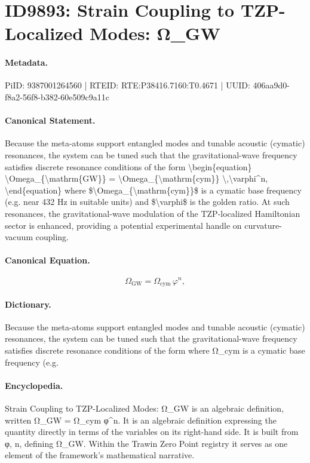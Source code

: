 \section*{ID9893: Strain Coupling to TZP-Localized Modes: Ω\_GW}
\paragraph{Metadata.}
PiID: 9387001264560 | RTEID: RTE:P38416.7160:T0.4671 | UUID: 406aa9d0-f8a2-56f8-b382-60e509c9a11c

\paragraph{Canonical Statement.}
Because the meta-atoms support entangled modes and tunable acoustic (cymatic) resonances, the system can be tuned such that the gravitational-wave frequency satisfies discrete resonance conditions of the form \textbackslash{}begin\{equation\} \textbackslash{}Omega\_\{\textbackslash{}mathrm\{GW\}\} = \textbackslash{}Omega\_\{\textbackslash{}mathrm\{cym\}\} \textbackslash{},\textbackslash{}varphi\textasciicircum{}n, \textbackslash{}end\{equation\} where \$\textbackslash{}Omega\_\{\textbackslash{}mathrm\{cym\}\}\$ is a cymatic base frequency (e.g. near 432 Hz in suitable units) and \$\textbackslash{}varphi\$ is the golden ratio. At such resonances, the gravitational-wave modulation of the TZP-localized Hamiltonian sector is enhanced, providing a potential experimental handle on curvature-vacuum coupling.

\paragraph{Canonical Equation.}
\[
\Omega_{\mathrm{GW}} = \Omega_{\mathrm{cym}} \,\varphi^n,
\]

\paragraph{Dictionary.}
Because the meta-atoms support entangled modes and tunable acoustic (cymatic) resonances, the system can be tuned such that the gravitational-wave frequency satisfies discrete resonance conditions of the form where Ω\_cym is a cymatic base frequency (e.g.

\paragraph{Encyclopedia.}
Strain Coupling to TZP-Localized Modes: Ω\_GW is an algebraic definition, written Ω\_GW = Ω\_cym φ\textasciicircum{}n. It is an algebraic definition expressing the quantity directly in terms of the variables on its right-hand side. It is built from φ, n, defining Ω\_GW. Within the Trawin Zero Point registry it serves as one element of the framework's mathematical narrative.
